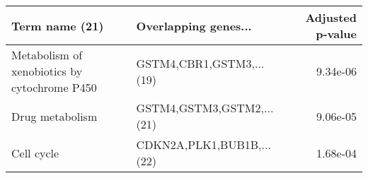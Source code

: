 \begin{tabular}{llr}
\toprule
                              Term name (21) &      Overlapping genes... &  Adjusted p-value \\
\midrule
Metabolism of xenobiotics by cytochrome P450 &  GSTM4,CBR1,GSTM3,...(19) &          9.34e-06 \\
                             Drug metabolism & GSTM4,GSTM3,GSTM2,...(21) &          9.06e-05 \\
                                  Cell cycle & CDKN2A,PLK1,BUB1B,...(22) &          1.68e-04 \\
\bottomrule
\end{tabular}
